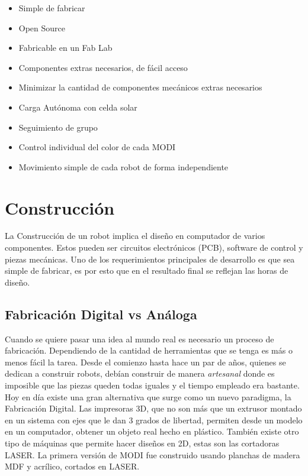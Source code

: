 \begin{itemize}
\item Simple de fabricar
\item Open Source
\item Fabricable en un Fab Lab
\item Componentes extras necesarios, de fácil acceso
\item Minimizar la cantidad de componentes mecánicos extras necesarios
\item Carga Autónoma con celda solar
\item Seguimiento de grupo
\item Control individual del color de cada MODI
\item Movimiento simple de cada robot de forma independiente
\end{itemize}


\section{Construcción}

La Construcción de un robot implica el diseño en computador de varios componentes. Estos pueden ser circuitos electrónicos (PCB), software de control y piezas mecánicas. Uno de los requerimientos principales de desarrollo es que sea simple de fabricar, es por esto que en el resultado final se reflejan las horas de diseño.

\subsection{Fabricación Digital vs Análoga}
Cuando se quiere pasar una idea al mundo real es necesario un proceso de fabricación. Dependiendo de la cantidad de herramientas que se tenga es más o menos fácil la tarea. Desde el comienzo hasta hace un par de años, quienes se dedican a construir robots, debían construir de manera \textit{artesanal} donde es imposible que las piezas queden todas iguales y el tiempo empleado era bastante. Hoy en día existe una gran alternativa que surge como un nuevo paradigma, la Fabricación Digital. Las impresoras 3D, que no son más que un extrusor montado en un sistema con ejes que le dan 3 grados de libertad, permiten desde un modelo en un computador, obtener un objeto real hecho en plástico. También existe otro tipo de máquinas que permite hacer diseños en 2D, estas son las cortadoras LASER. La primera versión de MODI fue construido usando planchas de madera MDF y acrílico, cortados en LASER.

